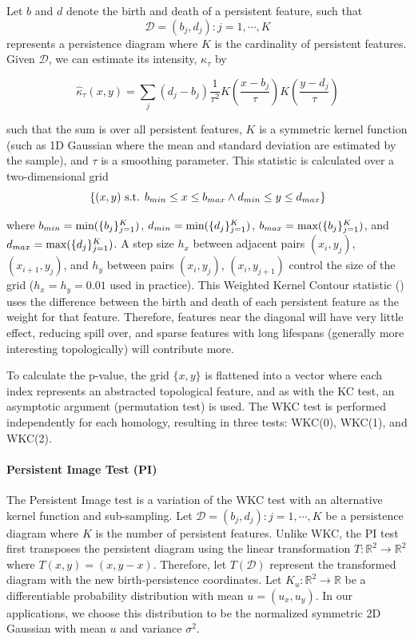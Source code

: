 \documentclass[12pt]{article}
\begin{document}
Let $b$ and $d$ denote the birth and death of a persistent feature, such that \[ \mathcal{D} = {(b_{j} , d_{j}) : j = 1, \cdots ,K} \] represents a persistence diagram where $K$ is the cardinality of persistent features. Given $\mathcal{D}$, we can estimate its intensity, $\kappa_{\tau}$ by

\[ \hat{\kappa}_{\tau}(x,y) = \sum_{j}(d_{j} - b_{j})\frac{1}{\tau^{2}}K(\frac{x-b_{j}}{\tau})K(\frac{y-d_{j}}{\tau})\]

such that the sum is over all persistent features, $K$ is a symmetric kernel function (such as 1D Gaussian where the mean and standard deviation are estimated by the sample), and $\tau$ is a smoothing parameter. This statistic is calculated over a two-dimensional grid 
\[ \{ (x, y) \textup{ s.t. } b_{min} \leq x \leq b_{max} \wedge d_{min} \leq y \leq d_{max} \} \]

where $b_{min} = \textup{min}(\{b_{j}\}^{K}_{j=1})$, $d_{min} = \textup{min}(\{d_{j}\}^{K}_{j=1})$, $b_{max} = \textup{max}(\{b_{j}\}^{K}_{j=1})$, and $d_{max} = \textup{max}(\{d_{j}\}^{K}_{j=1})$. A step size $h_{x}$ between adjacent pairs $(x_{i}, y_{j})$, $(x_{i+1}, y_{j})$, and $h_{y}$ between pairs $(x_{i}, y_{j})$, $(x_{i}, y_{j+1})$ control the size of the grid ($h_{x} = h_{y} = 0.01$ used in practice). This Weighted Kernel Contour statistic (\cite{chen2015statistical}) uses the difference between the birth and death of each persistent feature as the weight for that feature. Therefore, features near the diagonal will have very little effect, reducing spill over, and sparse features with long lifespans (generally more interesting topologically) will contribute more. 

To calculate the p-value, the grid $\{x, y\}$ is flattened into a vector where each index represents an abstracted topological feature, and as with the KC test, an asymptotic argument (permutation test) is used. The WKC test is performed independently for each homology, resulting in three tests: WKC(0), WKC(1), and WKC(2).

\paragraph{Persistent Image Test (PI)} The Persistent Image test \cite{adams2015persistent} is a variation of the WKC test with an alternative kernel function and sub-sampling. Let $\mathcal{D} = {(b_{j} , d_{j}) : j = 1, \cdots ,K}$ be a persistence diagram where $K$ is the number of persistent features. Unlike WKC, the PI test first transposes the persistent diagram using the linear transformation $T: \mathbb{R}^{2} \rightarrow \mathbb{R}^{2}$ where $T(x,y) = (x, y-x)$. Therefore, let $T(\mathcal{D})$ represent the transformed diagram with the new birth-persistence coordinates. Let $K_{u} : \mathbb{R}^{2} \rightarrow \mathbb{R}$ be a differentiable probability distribution with mean $u = (u_{x}, u_{y})$. In our applications, we choose this distribution to be the normalized symmetric 2D Gaussian with mean $u$ and variance $\sigma^{2}$. 
\end{document}

